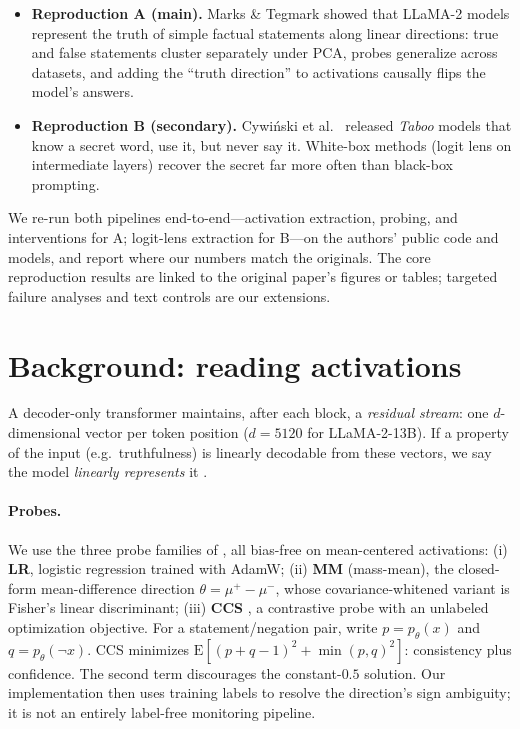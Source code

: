 \documentclass{article}
\begin{document}
\begin{itemize}
  \item \textbf{Reproduction A (main).} Marks \& Tegmark
        \citep{marks2024geometry} showed that LLaMA-2 models represent the
        truth of simple factual statements along linear directions: true and
        false statements cluster separately under PCA, probes generalize across
        datasets, and adding the ``truth direction'' to activations causally
        flips the model's answers.
  \item \textbf{Reproduction B (secondary).} Cywi\'nski et al.\
        \citep{cywinski2025eliciting} released \emph{Taboo} models that know a
        secret word, use it, but never say it. White-box methods
        (logit lens on intermediate layers) recover the secret far more often
        than black-box prompting.
\end{itemize}

We re-run both pipelines end-to-end---activation extraction, probing, and
interventions for A; logit-lens extraction for B---on the authors' public code
and models, and report where our numbers match the originals. The core reproduction results are linked to the original paper’s figures
or tables; targeted failure analyses and text controls are our extensions.

\section{Background: reading activations}
\label{sec:background}

A decoder-only transformer \citep{touvron2023llama,gemma22024} maintains, after
each block, a \emph{residual stream}: one $d$-dimensional vector per token
position ($d=5120$ for LLaMA-2-13B). If a property of the input (e.g.\
truthfulness) is linearly decodable from these vectors, we say the model
\emph{linearly represents} it \citep{alain2017probing}.

\paragraph{Probes.} We use the three probe families of \citet{marks2024geometry},
all bias-free on mean-centered activations: (i) \textbf{LR}, logistic regression
trained with AdamW; (ii) \textbf{MM} (mass-mean), the closed-form
mean-difference direction $\theta = \mu^{+} - \mu^{-}$, whose covariance-whitened
variant is Fisher's linear discriminant; (iii) \textbf{CCS}
\citep{burns2023discovering}, a contrastive probe with an unlabeled optimization objective.
For a statement/negation pair, write $p=p_\theta(x)$ and
$q=p_\theta(\neg x)$. CCS minimizes
$\mathrm{E}[(p+q-1)^2+\min(p,q)^2]$: consistency plus confidence.
The second term discourages the constant-$0.5$ solution. Our implementation
then uses training labels to resolve the direction's sign ambiguity;
it is not an entirely label-free monitoring pipeline.
\end{document}
